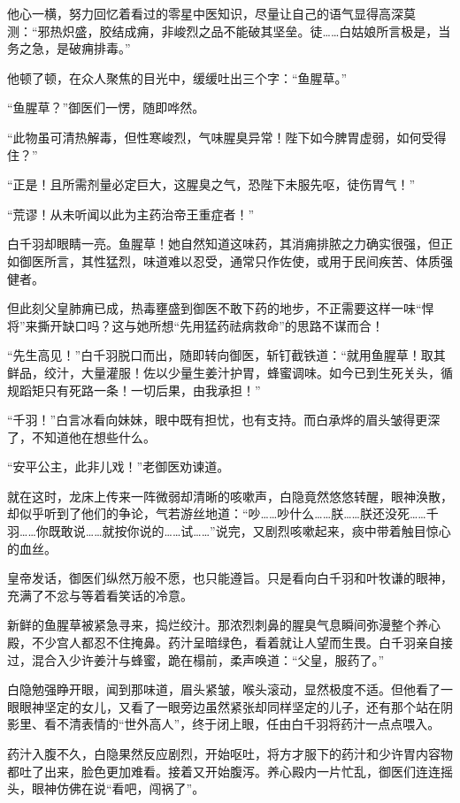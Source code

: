 他心一横，努力回忆着看过的零星中医知识，尽量让自己的语气显得高深莫测：“邪热炽盛，胶结成痈，非峻烈之品不能破其坚垒。徒……白姑娘所言极是，当务之急，是破痈排毒。”

他顿了顿，在众人聚焦的目光中，缓缓吐出三个字：“鱼腥草。”

“鱼腥草？”御医们一愣，随即哗然。

“此物虽可清热解毒，但性寒峻烈，气味腥臭异常！陛下如今脾胃虚弱，如何受得住？”

“正是！且所需剂量必定巨大，这腥臭之气，恐陛下未服先呕，徒伤胃气！”

“荒谬！从未听闻以此为主药治帝王重症者！”

白千羽却眼睛一亮。鱼腥草！她自然知道这味药，其消痈排脓之力确实很强，但正如御医所言，其性猛烈，味道难以忍受，通常只作佐使，或用于民间疾苦、体质强健者。

但此刻父皇肺痈已成，热毒壅盛到御医不敢下药的地步，不正需要这样一味“悍将”来撕开缺口吗？这与她所想“先用猛药祛病救命”的思路不谋而合！

“先生高见！”白千羽脱口而出，随即转向御医，斩钉截铁道：“就用鱼腥草！取其鲜品，绞汁，大量灌服！佐以少量生姜汁护胃，蜂蜜调味。如今已到生死关头，循规蹈矩只有死路一条！一切后果，由我承担！”

“千羽！”白言冰看向妹妹，眼中既有担忧，也有支持。而白承烨的眉头皱得更深了，不知道他在想些什么。

“安平公主，此非儿戏！”老御医劝谏道。

就在这时，龙床上传来一阵微弱却清晰的咳嗽声，白隐竟然悠悠转醒，眼神涣散，却似乎听到了他们的争论，气若游丝地道：“吵……吵什么……朕……朕还没死……千羽……你既敢说……就按你说的……试……”说完，又剧烈咳嗽起来，痰中带着触目惊心的血丝。

皇帝发话，御医们纵然万般不愿，也只能遵旨。只是看向白千羽和叶牧谦的眼神，充满了不忿与等着看笑话的冷意。

新鲜的鱼腥草被紧急寻来，捣烂绞汁。那浓烈刺鼻的腥臭气息瞬间弥漫整个养心殿，不少宫人都忍不住掩鼻。药汁呈暗绿色，看着就让人望而生畏。白千羽亲自接过，混合入少许姜汁与蜂蜜，跪在榻前，柔声唤道：“父皇，服药了。”

白隐勉强睁开眼，闻到那味道，眉头紧皱，喉头滚动，显然极度不适。但他看了一眼眼神坚定的女儿，又看了一眼旁边虽然紧张却同样坚定的儿子，还有那个站在阴影里、看不清表情的“世外高人”，终于闭上眼，任由白千羽将药汁一点点喂入。

药汁入腹不久，白隐果然反应剧烈，开始呕吐，将方才服下的药汁和少许胃内容物都吐了出来，脸色更加难看。接着又开始腹泻。养心殿内一片忙乱，御医们连连摇头，眼神仿佛在说“看吧，闯祸了”。

